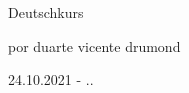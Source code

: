 \thispagestyle {empty} %

\begin{flushleft}
    
    \vspace*{\fill}
    
    {\Big Deutschkurs}\par
    
    {por duarte vicente drumond}\par\vspace{1cm}
    
    {24.10.2021  - \the\day.\the\month.\the\year}\par\vspace{1cm}
    
    \vspace*{\fill}
        
\end{flushleft}
        